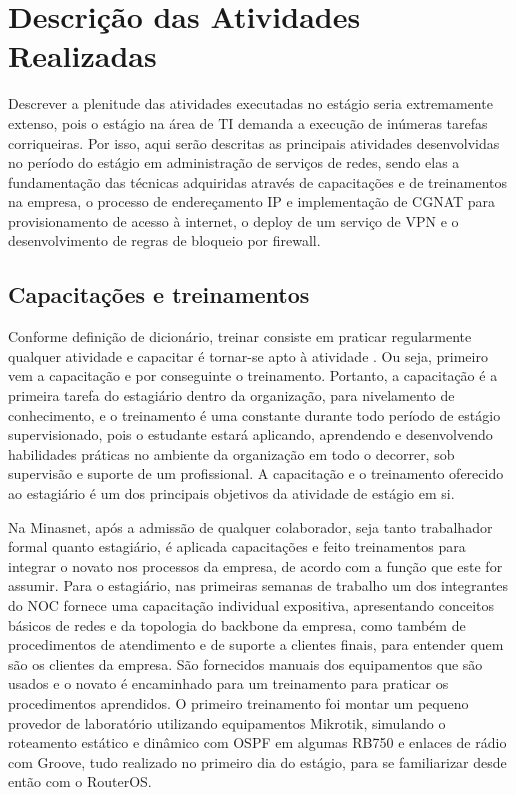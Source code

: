 \chapter{Descrição das Atividades Realizadas}

    Descrever a plenitude das atividades executadas no estágio seria extremamente extenso, pois o estágio na área de TI demanda a execução de inúmeras tarefas corriqueiras. Por isso, aqui serão descritas as principais atividades desenvolvidas no período do estágio em administração de serviços de redes, sendo elas a fundamentação das técnicas adquiridas através de capacitações e de treinamentos na empresa, o processo de endereçamento IP e implementação de CGNAT para provisionamento de acesso à internet, o deploy de um serviço de VPN e o desenvolvimento de regras de bloqueio por firewall. 

\section{Capacitações e treinamentos}

    Conforme definição de dicionário, treinar consiste em praticar regularmente qualquer atividade e capacitar é tornar-se apto à atividade \cite{michaelis2015}. Ou seja, primeiro vem a capacitação e por conseguinte o treinamento. Portanto, a capacitação é a primeira tarefa do estagiário dentro da organização, para nivelamento de conhecimento, e o treinamento é uma constante durante todo período de estágio supervisionado, pois o estudante estará aplicando, aprendendo e desenvolvendo habilidades práticas no ambiente da organização em todo o decorrer, sob supervisão e suporte de um profissional. A capacitação e o treinamento oferecido ao estagiário é um dos principais objetivos da atividade de estágio em si.
    
    Na Minasnet, após a admissão de qualquer colaborador, seja tanto trabalhador formal quanto estagiário, é aplicada capacitações e feito treinamentos para integrar o novato nos processos da empresa, de acordo com a função que este for assumir. Para o estagiário, nas primeiras semanas de trabalho um dos integrantes do NOC fornece uma capacitação individual expositiva, apresentando conceitos básicos de redes e da topologia do backbone da empresa, como também de procedimentos de atendimento e de suporte a clientes finais, para entender quem são os clientes da empresa. São fornecidos manuais dos equipamentos que são usados e o novato é encaminhado para um treinamento para praticar os procedimentos aprendidos. O primeiro treinamento foi montar um pequeno provedor de laboratório utilizando equipamentos Mikrotik, simulando o roteamento estático e dinâmico com OSPF em algumas RB750 e enlaces de rádio com Groove, tudo realizado no primeiro dia do estágio, para se familiarizar desde então com o RouterOS.
    
